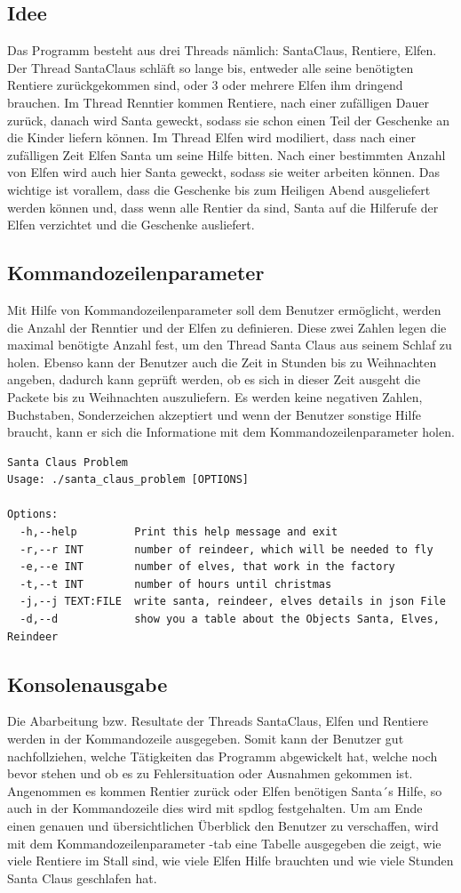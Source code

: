 \documentclass[a4paper,12pt]{article}
\begin{document}
\subsection{Idee}
Das Programm besteht aus drei Threads nämlich: SantaClaus, Rentiere, Elfen. Der Thread SantaClaus schläft so lange bis, entweder alle seine benötigten Rentiere zurückgekommen sind, oder 3 oder mehrere Elfen ihm dringend brauchen.
Im Thread Renntier kommen Rentiere, nach einer zufälligen Dauer zurück, danach wird Santa geweckt, sodass sie schon einen Teil der Geschenke an die Kinder liefern können. Im Thread Elfen wird modiliert, dass
nach einer zufälligen Zeit Elfen Santa um seine Hilfe bitten. Nach einer bestimmten Anzahl von Elfen wird auch hier Santa geweckt, sodass sie weiter arbeiten können. Das wichtige ist vorallem, dass die Geschenke bis zum Heiligen Abend
ausgeliefert werden können und, dass wenn alle Rentier da sind, Santa auf die Hilferufe der Elfen verzichtet und die Geschenke ausliefert.

\subsection{Kommandozeilenparameter}
Mit Hilfe von Kommandozeilenparameter soll dem Benutzer ermöglicht, werden die Anzahl der Renntier und der Elfen zu definieren. Diese zwei Zahlen legen die maximal benötigte Anzahl fest, um den Thread Santa Claus aus seinem Schlaf zu holen.
Ebenso kann der Benutzer auch die Zeit in Stunden bis zu Weihnachten angeben, dadurch kann geprüft werden, ob es sich in dieser Zeit ausgeht die Packete bis zu Weihnachten auszuliefern.
Es werden keine negativen Zahlen, Buchstaben, Sonderzeichen akzeptiert und wenn der Benutzer sonstige Hilfe braucht, kann er sich die Informatione mit dem Kommandozeilenparameter holen.
\begin{verbatim}
Santa Claus Problem
Usage: ./santa_claus_problem [OPTIONS]

Options:
  -h,--help         Print this help message and exit
  -r,--r INT        number of reindeer, which will be needed to fly
  -e,--e INT        number of elves, that work in the factory
  -t,--t INT        number of hours until christmas
  -j,--j TEXT:FILE  write santa, reindeer, elves details in json File
  -d,--d            show you a table about the Objects Santa, Elves, Reindeer
\end{verbatim}

\subsection{Konsolenausgabe}
Die Abarbeitung bzw. Resultate der Threads SantaClaus, Elfen und Rentiere werden in der Kommandozeile ausgegeben. Somit kann der Benutzer gut nachfollziehen, welche Tätigkeiten das Programm abgewickelt hat, welche noch bevor stehen und
ob es zu Fehlersituation oder Ausnahmen gekommen ist. Angenommen es kommen Rentier zurück oder Elfen benötigen Santa´s Hilfe, so auch in der Kommandozeile dies wird mit spdlog festgehalten. Um am Ende einen genauen und übersichtlichen 
Überblick den Benutzer zu verschaffen, wird mit dem Kommandozeilenparameter -tab eine Tabelle ausgegeben die zeigt, wie viele Rentiere im Stall sind, wie viele Elfen Hilfe brauchten und wie viele Stunden Santa Claus geschlafen hat.
\newpage
\end{document}
